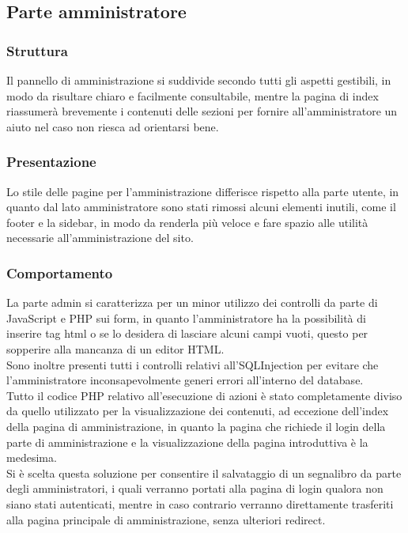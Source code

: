 \documentclass[openany, a4paper, 12pt]{report}
\begin{document}
	\subsection{Parte amministratore}
		\subsubsection{Struttura}
		Il pannello di amministrazione si suddivide secondo tutti gli aspetti gestibili, in modo da risultare chiaro e facilmente consultabile, mentre la pagina di index riassumerà brevemente i contenuti delle sezioni per fornire all'amministratore un aiuto nel caso non riesca ad orientarsi bene.
		\subsubsection{Presentazione}
		Lo stile delle pagine per l'amministrazione differisce rispetto alla parte utente, in quanto dal lato amministratore sono stati rimossi alcuni elementi inutili, come il footer e la sidebar, in modo da renderla più veloce e fare spazio alle utilità necessarie all'amministrazione del sito.
		\subsubsection{Comportamento}
		La parte admin si caratterizza per un minor utilizzo dei controlli da parte di JavaScript e PHP sui form, in quanto l'amministratore ha la possibilità di inserire tag html o se lo desidera di lasciare alcuni campi vuoti, questo per sopperire alla mancanza di un editor HTML.\\
		Sono inoltre presenti tutti i controlli relativi all'SQLInjection per evitare che l'amministratore inconsapevolmente generi errori all'interno del database.\\
		Tutto il codice PHP relativo all'esecuzione di azioni è stato completamente diviso da quello utilizzato per la visualizzazione dei contenuti, ad eccezione dell'index della pagina di amministrazione, in quanto la pagina che richiede il login della parte di amministrazione e la visualizzazione della pagina introduttiva è la medesima.\\
		Si è scelta questa soluzione per consentire il salvataggio di un segnalibro da parte degli amministratori, i quali verranno portati alla pagina di login qualora non siano stati autenticati, mentre in caso contrario verranno direttamente trasferiti alla pagina principale di amministrazione, senza ulteriori redirect.
\end{document}
